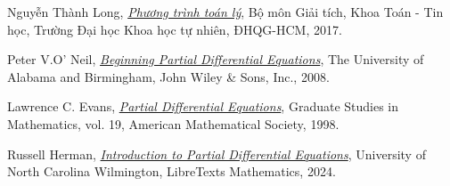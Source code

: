 \documentclass[10pt, a4paper]{article}
\begin{document}
\newpage
\begin{thebibliography}{1}
 Nguyễn Thành Long, \textit{\href{https://drive.google.com/file/d/1RPRrqId9-08bfTKazocns1gklrmpyDrM/view?usp=drive_link}{Phương trình toán lý}}, Bộ môn Giải tích, Khoa Toán - Tin học, Trường Đại học Khoa học tự nhiên, ĐHQG-HCM, 2017.

 Peter V.O' Neil, \textit{\href{https://libgen.is/book/index.php?md5=D24358102866676081EED6FF319C84E6}{Beginning Partial Differential Equations}}, The University of Alabama and Birmingham, John Wiley \& Sons, Inc., 2008.

 Lawrence C. Evans, \textit{\href{https://libgen.is/book/index.php?md5=6D9DF85A10396346D4CD5261DEE06AC4}{Partial Differential Equations}}, Graduate Studies in Mathematics, vol. 19, American Mathematical Society, 1998.

 Russell Herman, \textit{\href{https://math.libretexts.org/Bookshelves/Differential_Equations/Introduction_to_Partial_Differential_Equations_(Herman)}{Introduction to Partial Differential Equations}}, University of North Carolina Wilmington, LibreTexts Mathematics, 2024.
\end{thebibliography}
\end{document}
